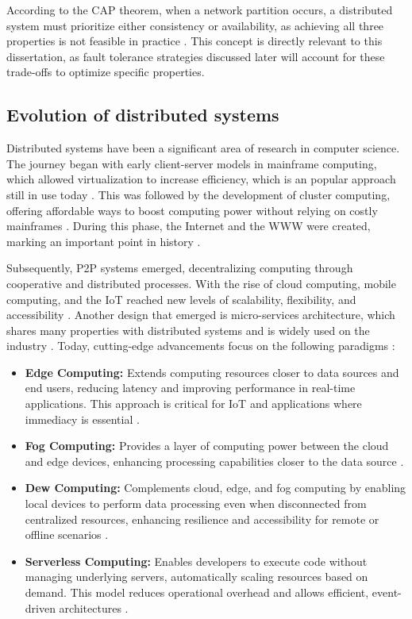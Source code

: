 According to the CAP theorem, when a network partition occurs, a distributed system must prioritize either consistency or availability, as achieving all three properties is not feasible in practice \cite{Tanenbaum2023, ibm-cap-theorem, Vitillo2021}. This concept is directly relevant to this dissertation, as fault tolerance strategies discussed later will account for these trade-offs to optimize specific properties.

\subsection{Evolution of distributed systems}

Distributed systems have been a significant area of research in computer science. The journey began with early client-server models in mainframe computing, which allowed virtualization to increase efficiency, which is an popular approach still in use today \cite{Lindsay2021}. This was followed by the development of cluster computing, offering affordable ways to boost computing power without relying on costly mainframes \cite{Lindsay2021, Gill2024}. During this phase, the Internet and the \gls{WWW} were created, marking an important point in history \cite{Lindsay2021}.

Subsequently, \gls{P2P} systems emerged, decentralizing computing through cooperative and distributed processes. With the rise of cloud computing, mobile computing, and the \gls{IoT} reached new levels of scalability, flexibility, and accessibility \cite{Gill2024}. Another design that emerged is micro-services architecture, which shares many properties with distributed systems and is widely used on the industry \cite{Adbelfattah2023}. Today, cutting-edge advancements focus on the following paradigms \cite{Gill2024}:

\begin{itemize}
	\item \textbf{Edge Computing:} Extends computing resources closer to data sources and end users, reducing latency and improving performance in real-time applications. This approach is critical for \gls{IoT} and applications where immediacy is essential \cite{Cao2020, Lindsay2021, Gill2024}.
	\item \textbf{Fog Computing:} Provides a layer of computing power between the cloud and edge devices, enhancing processing capabilities closer to the data source \cite{Cao2020, Lindsay2021, Gill2024}.
	\item \textbf{Dew Computing:} Complements cloud, edge, and fog computing by enabling local devices to perform data processing even when disconnected from centralized resources, enhancing resilience and accessibility for remote or offline scenarios \cite{Gusev2021, Gill2024}.
	\item \textbf{Serverless Computing:} Enables developers to execute code without managing underlying servers, automatically scaling resources based on demand. This model reduces operational overhead and allows efficient, event-driven architectures \cite{Yongkang2023, Gill2024}.
\end{itemize}

